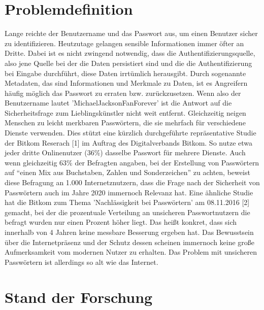 \section{Problemdefinition}
Lange reichte der Benutzername und das Passwort aus, um einen Benutzer sicher zu identifizieren. Heutzutage gelangen sensible Informationen immer öfter an Dritte. Dabei ist es nicht zwingend notwendig, dass die Authentifizierungsquelle, also jene Quelle bei der die Daten persistiert sind und die die Authentifizierung bei Eingabe durchführt, diese Daten irrtümlich herausgibt. Durch sogenannte Metadaten, das sind Informationen und Merkmale zu Daten, ist es Angreifern häufig möglich das Passwort zu erraten bzw. zurückzusetzen. Wenn also der Benutzername lautet 'MichaelJacksonFanForever' ist die Antwort auf die Sicherheitsfrage zum Lieblingskünstler nicht weit entfernt.
Gleichzeitig neigen Menschen zu leicht merkbaren Passwörtern, die sie mehrfach für verschiedene Dienste verwenden. Dies stützt eine kürzlich durchgeführte repräsentative Studie der Bitkom Reserach [1] im Auftrag des Digitalverbands Bitkom. So nutze etwa jeder dritte Onlinenutzer (36\%) dasselbe Passwort für mehrere Dienste. Auch wenn gleichzeitig 63\% der Befragten angaben, bei der Erstellung von Passwörtern auf ``einen Mix aus Buchstaben, Zahlen und Sonderzeichen'' zu achten, beweist diese Befragung an 1.000 Internetznutzern, dass die Frage nach der Sicherheit von Passwörtern auch im Jahre 2020 immernoch Relevanz hat. Eine ähnliche Studie hat die Bitkom zum Thema 'Nachlässigkeit bei Passwörtern' am 08.11.2016 [2] gemacht, bei der die prozentuale Verteilung an unsicheren Passwortnutzern die befragt wurden nur einen Prozent höher liegt. Das heißt konkret, dass sich innerhalb von 4 Jahren keine messbare Besserung ergeben hat. Das Bewusstsein über die Internetpräsenz und der Schutz dessen scheinen immernoch keine große Aufmerksamkeit vom modernen Nutzer zu erhalten. Das Problem mit unsicheren Passwörtern ist allerdings so alt wie das Internet.

\section{Stand der Forschung}
